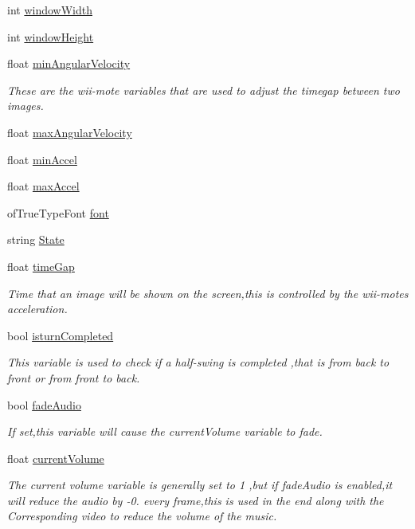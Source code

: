 \begin{DoxyCompactItemize}
int \hyperlink{classtest_app_a9ed611377cd46f5148a3a3d538e96484}{window\-Width}
\item 
int \hyperlink{classtest_app_a4e8884eeef5b2657b62278969d4e3dcf}{window\-Height}
\item 
float \hyperlink{classtest_app_ac559756a01e0b98378bc29dfba9fac79}{min\-Angular\-Velocity}
\begin{DoxyCompactList}\small\item\em These are the wii-\/mote variables that are used to adjust the timegap between two images. \end{DoxyCompactList}\item 
float \hyperlink{classtest_app_ab9565e8e6dc748ef68e6845f5f94cae9}{max\-Angular\-Velocity}
\item 
float \hyperlink{classtest_app_ab007edbc20b09d607f8010e2dbafdb97}{min\-Accel}
\item 
float \hyperlink{classtest_app_a34e834a5e4d359700147a74eece8eed1}{max\-Accel}
\item 
of\-True\-Type\-Font \hyperlink{classtest_app_a0fdf83c29e178256ee0c1a5b9ee81653}{font}
\item 
string \hyperlink{classtest_app_a8ce5505df4526abed238956b65956edd}{State}
\item 
float \hyperlink{classtest_app_a944f2713019239a4b49241a5cc9a00c9}{time\-Gap}
\begin{DoxyCompactList}\small\item\em Time that an image will be shown on the screen,this is controlled by the wii-\/motes acceleration. \end{DoxyCompactList}\item 
bool \hyperlink{classtest_app_a42478a80a90ce9f663c04bcdaea5c5bd}{isturn\-Completed}
\begin{DoxyCompactList}\small\item\em This variable is used to check if a half-\/swing is completed ,that is from back to front or from front to back. \end{DoxyCompactList}\item 
bool \hyperlink{classtest_app_a918c09b5a4389a8402cfacb25d390226}{fade\-Audio}
\begin{DoxyCompactList}\small\item\em If set,this variable will cause the current\-Volume variable to fade. \end{DoxyCompactList}\item 
float \hyperlink{classtest_app_a51c20c5432d9f6b06f719526d9a34ee6}{current\-Volume}
\begin{DoxyCompactList}\small\item\em The current volume variable is generally set to 1 ,but if fade\-Audio is enabled,it will reduce the audio by -\/0. every frame,this is used in the end along with the Corresponding video to reduce the volume of the music. \end{DoxyCompactList}\item 

\end{DoxyCompactItemize}
